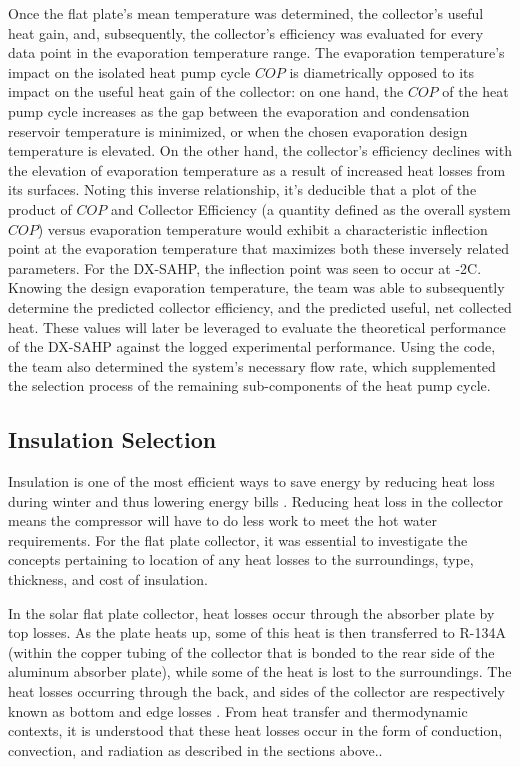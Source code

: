 \medskip
Once the flat plate’s mean temperature was determined, the collector’s useful heat gain, and, subsequently, the collector’s efficiency was evaluated for every data point in the evaporation temperature range. The evaporation temperature’s impact on the isolated heat pump cycle $COP$ is diametrically opposed to its impact on the useful heat gain of the collector: on one hand, the $COP$ of the heat pump cycle increases as the gap between the evaporation and condensation reservoir temperature is minimized, or when the chosen evaporation design temperature is elevated. On the other hand, the collector’s efficiency declines with the elevation of evaporation temperature as a result of increased heat losses from its surfaces. Noting this inverse relationship, it’s deducible that a plot of the product of $COP$ and Collector Efficiency (a quantity defined as the overall system $COP$) versus evaporation temperature would exhibit a characteristic inflection point at the evaporation temperature that maximizes both these inversely related parameters. For the DX-SAHP, the inflection point was seen to occur at -2\textdegree C. Knowing the design evaporation temperature, the team was able to subsequently determine the predicted collector efficiency, and the predicted useful, net collected heat. These values will later be leveraged to evaluate the theoretical performance of the DX-SAHP against the logged experimental performance. Using the code, the team also determined the system’s necessary flow rate, which supplemented the selection process of the remaining sub-components of the heat pump cycle.

\subsection{Insulation Selection}

Insulation is one of the most efficient ways to save energy by reducing heat loss during winter and thus lowering energy bills \cite{insulation}. Reducing heat loss in the collector means the compressor will have to do less work to meet the hot water requirements. For the flat plate collector, it was essential to investigate the concepts pertaining to location of any heat losses to the surroundings, type, thickness, and cost of insulation.

\medskip
In the solar flat plate collector, heat losses occur through the absorber plate by top losses. As the plate heats up, some of this heat is then transferred to R-134A (within the copper tubing of the collector that is bonded to the rear side of the aluminum absorber plate), while some of the heat is lost to the surroundings. The heat losses occurring through the back, and sides of the collector are respectively known as bottom and edge losses \cite{heat_losses}. From heat transfer and thermodynamic contexts, it is understood that these heat losses occur in the form of conduction, convection, and radiation as described in the sections above.\cite{heat_losses}.

